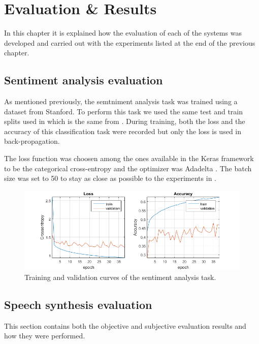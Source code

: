 \chapter{Evaluation \& Results}

In this chapter it is explained how the evaluation of each of the systems was developed and carried out with the experiments listed at the end of the previous chapter.

\section{Sentiment analysis evaluation}

As mentioned previously, the semtniment analysis task was trained using a dataset from Stanford. To perform this task we used the same test and train splits used in \cite{socher2013recursive} which is the same from \cite{DBLP:journals/corr/Kim14f}. During training, both the loss and the accuracy of this classification task were recorded but only the loss is used in back-propagation.

The loss function was choosen among the ones available in the Keras framework to be the categorical cross-entropy \cite{golik2013cross} and the optimizer was Adadelta \cite{zeiler2012adadelta}. The batch size was set to 50 to stay as close as possible to the experiments in \cite{DBLP:journals/corr/Kim14f}.

\begin{figure}[h]
    \centering
    \includegraphics[width=16cm]{figures/sa}
    \caption{Training and validation curves of the sentiment analysis task.}
\end{figure}

\section{Speech synthesis evaluation}

This section contains both the objective and subjective evaluation results and how they were performed.

